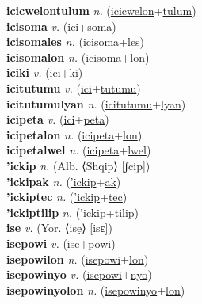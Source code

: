 \textbf{icicwelontulum} \textit{n.} (\hyperref[icicwelon]{icicwelon}+\hyperref[tulum]{tulum})
 \label{icicwelontulum} \\
\textbf{icisoma} \textit{v.} (\hyperref[ici]{ici}+\hyperref[soma]{soma})
 \label{icisoma} \\
\textbf{icisomales} \textit{n.} (\hyperref[icisoma]{icisoma}+\hyperref[les]{les})
 \label{icisomales} \\
\textbf{icisomalon} \textit{n.} (\hyperref[icisoma]{icisoma}+\hyperref[lon]{lon})
 \label{icisomalon} \\
\textbf{iciki} \textit{v.} (\hyperref[ici]{ici}+\hyperref[ki]{ki})
 \label{iciki} \\
\textbf{icitutumu} \textit{v.} (\hyperref[ici]{ici}+\hyperref[tutumu]{tutumu})
 \label{icitutumu} \\
\textbf{icitutumulyan} \textit{n.} (\hyperref[icitutumu]{icitutumu}+\hyperref[lyan]{lyan})
 \label{icitutumulyan} \\
\textbf{icipeta} \textit{v.} (\hyperref[ici]{ici}+\hyperref[peta]{peta})
 \label{icipeta} \\
\textbf{icipetalon} \textit{n.} (\hyperref[icipeta]{icipeta}+\hyperref[lon]{lon})
 \label{icipetalon} \\
\textbf{icipetalwel} \textit{n.} (\hyperref[icipeta]{icipeta}+\hyperref[lwel]{lwel})
 \label{icipetalwel} \\
\textbf{'ickip} \textit{n.} (Alb. ⟨Shqip⟩ [ʃcip])
 \label{'ickip} \\
\textbf{'ickipak} \textit{n.} (\hyperref['ickip]{'ickip}+\hyperref[ak]{ak})
 \label{'ickipak} \\
\textbf{'ickiptec} \textit{n.} (\hyperref['ickip]{'ickip}+\hyperref[tec]{tec})
 \label{'ickiptec} \\
\textbf{'ickiptilip} \textit{n.} (\hyperref['ickip]{'ickip}+\hyperref[tilip]{tilip})
 \label{'ickiptilip} \\
\textbf{ise} \textit{v.} (Yor. ⟨isẹ⟩ [isɛ])
 \label{ise} \\
\textbf{isepowi} \textit{v.} (\hyperref[ise]{ise}+\hyperref[powi]{powi})
 \label{isepowi} \\
\textbf{isepowilon} \textit{n.} (\hyperref[isepowi]{isepowi}+\hyperref[lon]{lon})
 \label{isepowilon} \\
\textbf{isepowinyo} \textit{v.} (\hyperref[isepowi]{isepowi}+\hyperref[nyo]{nyo})
 \label{isepowinyo} \\
\textbf{isepowinyolon} \textit{n.} (\hyperref[isepowinyo]{isepowinyo}+\hyperref[lon]{lon})
 \label{isepowinyolon} \\
